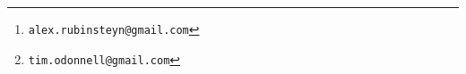 \usepackage{nips2013,times}


\usepackage[utf8]{inputenc} %
\usepackage[T1]{fontenc}    %
\usepackage{booktabs}       %
\usepackage{amsfonts}       %
\usepackage{nicefrac}       %
\usepackage{microtype}      %


\usepackage[space]{grffile}
\usepackage{natbib}
\usepackage{hyperref}       %
\usepackage{url}            %




\nipsfinalcopy

\author{
Alex Rubinsteyn \\
\thanks{\texttt{alex.rubinsteyn@gmail.com}} \\
Icahn School of Medicine at Mount Sinai \\
\And
Timothy O'Donnell \\
\thanks{\texttt{tim.odonnell@gmail.com}} \\
Icahn School of Medicine at Mount Sinai \\
\And
Nandita Damaraju \\
\texttt{nandita94@gmail.com} \\
Georgia Institute of Technology \\
\And
Jeff Hammerbacher \\
\texttt{jeff.hammerbacher@gmail.com} \\
Icahn School of Medicine at Mount Sinai \\
}
